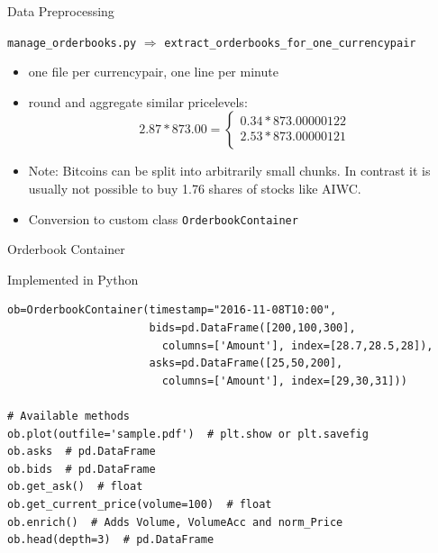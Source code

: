 \documentclass[10pt]{beamer}
\begin{document}
\begin{frame}[fragile]{Data Preprocessing}

  \lstinline{manage_orderbooks.py} $\Rightarrow$ \lstinline{extract_orderbooks_for_one_currencypair}
  \begin{itemize}
  \item one file per currencypair, one line per minute
  \item round and aggregate similar pricelevels:   
  \[ 2.87 * 873.00 =
  \begin{cases}
    0.34 * 873.00000122\\
    2.53 * 873.00000121\\
  \end{cases}
\]
  \item Note: Bitcoins can be split into arbitrarily small chunks. In contrast it is usually not possible to buy 1.76 shares of stocks like AIWC.
  \item Conversion to custom class \lstinline{OrderbookContainer}
  \end{itemize}
    
\end{frame}

\begin{frame}[fragile]{Orderbook Container}

Implemented in Python
\begin{lstlisting}[frame=single, breaklines=true, basicstyle=\scriptsize, belowskip=-1.0 \baselineskip]
ob=OrderbookContainer(timestamp="2016-11-08T10:00",
                      bids=pd.DataFrame([200,100,300],
                        columns=['Amount'], index=[28.7,28.5,28]),
                      asks=pd.DataFrame([25,50,200],
                        columns=['Amount'], index=[29,30,31]))
                        
# Available methods
ob.plot(outfile='sample.pdf')  # plt.show or plt.savefig
ob.asks  # pd.DataFrame
ob.bids  # pd.DataFrame
ob.get_ask()  # float
ob.get_current_price(volume=100)  # float
ob.enrich()  # Adds Volume, VolumeAcc and norm_Price
ob.head(depth=3)  # pd.DataFrame
\end{lstlisting}

  
\end{frame}
\end{document}
